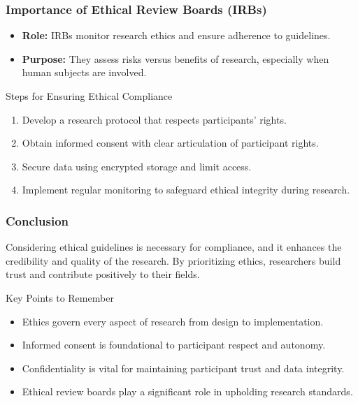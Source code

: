 \documentclass[aspectratio=169]{beamer}
\begin{document}
\begin{frame}[fragile]
    \frametitle{Importance of Ethical Review Boards (IRBs)}
    \begin{itemize}
        \item \textbf{Role:} IRBs monitor research ethics and ensure adherence to guidelines.
        \item \textbf{Purpose:} They assess risks versus benefits of research, especially when human subjects are involved.
    \end{itemize}
    
    \begin{block}{Steps for Ensuring Ethical Compliance}
        \begin{enumerate}
            \item Develop a research protocol that respects participants’ rights.
            \item Obtain informed consent with clear articulation of participant rights.
            \item Secure data using encrypted storage and limit access.
            \item Implement regular monitoring to safeguard ethical integrity during research.
        \end{enumerate}
    \end{block}
\end{frame}

\begin{frame}[fragile]
    \frametitle{Conclusion}
    Considering ethical guidelines is necessary for compliance, and it enhances the credibility and quality of the research. 
    By prioritizing ethics, researchers build trust and contribute positively to their fields.
    
    \begin{block}{Key Points to Remember}
        \begin{itemize}
            \item Ethics govern every aspect of research from design to implementation.
            \item Informed consent is foundational to participant respect and autonomy.
            \item Confidentiality is vital for maintaining participant trust and data integrity.
            \item Ethical review boards play a significant role in upholding research standards.
        \end{itemize}
    \end{block}
\end{frame}
\end{document}

